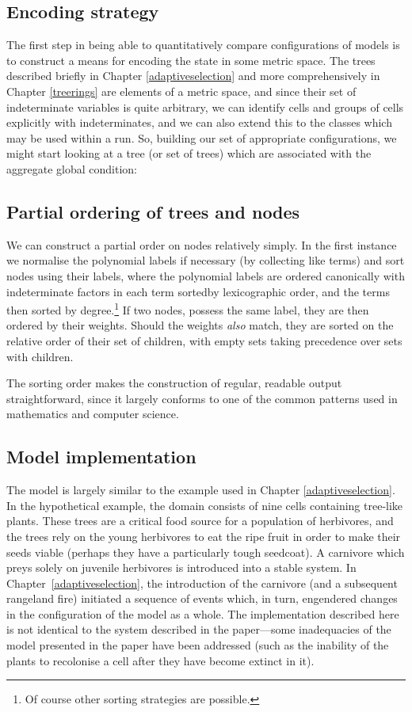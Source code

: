 \subsection{Encoding strategy}
The first step in being able to quantitatively compare configurations
of models is to construct a means for encoding the state in some
metric space.  The trees described briefly in Chapter
\ref{adaptiveselection} and more comprehensively in Chapter
\ref{treerings} are elements of a metric space, and since their set of
indeterminate variables is quite arbitrary, we can identify cells and
groups of cells explicitly with indeterminates, and we can also extend
this to the classes which may be used within a run.  So, building our
set of appropriate configurations, we might start looking at a tree
(or set of trees) which are associated with the aggregate global
condition:

\subsection{Partial ordering of trees and nodes}\label{partial-order}
We can construct a partial order on nodes relatively simply.  In the
first instance we normalise the polynomial labels if necessary (by
collecting like terms) and sort nodes using their labels, where the polynomial labels are
ordered canonically with indeterminate factors in each term sortedby
lexicographic order, and the terms then sorted by degree.\footnote{Of course
other sorting strategies are possible.} If two nodes, possess the same
label, they are then ordered by their weights.  Should the weights
\emph{also} match, they are sorted on the relative order of their set
of children, with empty sets taking precedence over sets with
children.

The sorting order makes the construction of regular, readable output
straightforward, since it largely conforms to one of the common
patterns used in mathematics and computer science. 

\subsection{Model implementation}

The model is largely similar to the example used in Chapter
\ref{adaptiveselection}. In the hypothetical example, the domain
consists of nine cells containing tree-like plants. These trees are a
critical food source for a population of herbivores, and the trees
rely on the young herbivores to eat the ripe fruit in order to make
their seeds viable (perhaps they have a particularly tough
seedcoat). A carnivore which preys solely on juvenile herbivores is
introduced into a stable system.  In Chapter~\ref{adaptiveselection},
the introduction of the carnivore (and a subsequent rangeland fire)
initiated a sequence of events which, in turn, engendered
changes in the configuration of the model as a whole.  The
implementation described here is not identical to the system described
in the paper---some inadequacies of the model presented in the paper
have been addressed (such as the inability of the plants to recolonise
a cell after they have become extinct in it).

